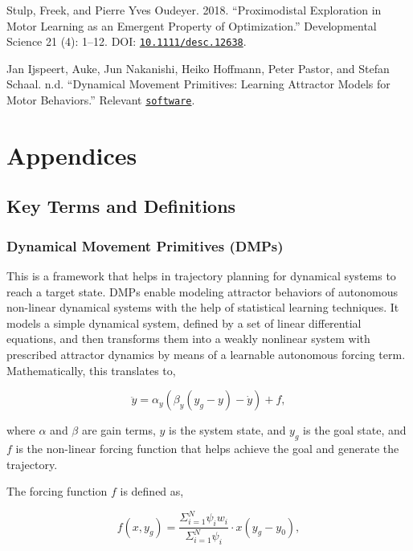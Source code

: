 \documentclass[10pt]{article}
\begin{document}
\begin{thebibliography}{5}
 Stulp, Freek, and Pierre Yves Oudeyer. 2018. “Proximodistal Exploration in Motor Learning as an Emergent Property of Optimization.” Developmental Science 21 (4): 1–12. DOI: \href{https://doi.org/10.1111/desc.12638}{\texttt{10.1111/desc.12638}}.

Jan Ijspeert, Auke, Jun Nakanishi, Heiko Hoffmann, Peter Pastor, and Stefan Schaal. n.d. “Dynamical Movement Primitives: Learning Attractor Models for Motor Behaviors.” Relevant  \href{http://www-clmc.usc.edu/Resources/Software}{\texttt{software}}.
\end{thebibliography}

\pagebreak

\appendix
\section*{Appendices}
\renewcommand{\thesubsection}{\Alph{subsection}}
\subsection{Key Terms and Definitions}\label{subsec:appendix_terms_def}
\subsubsection{Dynamical Movement Primitives (DMPs)}
This is a framework that helps in trajectory planning for dynamical systems to reach a target state. DMPs enable modeling attractor behaviors of autonomous non-linear dynamical systems with the help of statistical learning techniques. It models a simple dynamical system, defined by a set of linear differential equations, and then transforms them into a weakly nonlinear system with prescribed attractor dynamics by means of a learnable autonomous forcing term. Mathematically, this translates to,

\begin{equation}
    \ddot{y} = \alpha_y(\beta_y(y_g-y) - \dot{y}) + f,
\end{equation}

where $\alpha$ and $\beta$ are gain terms, $y$ is the system state, and $y_g$ is the goal state, and $f$ is the non-linear forcing function that helps achieve the goal and generate the trajectory.

The forcing function $f$ is defined as,

\begin{equation}
    f(x,y_g) = \frac{\Sigma_{i = 1}^{N} \psi_i w_i}{\Sigma_{i = 1}^{N} \psi_i}  \cdot x(y_g - y_0),
\end{equation}
\end{document}
